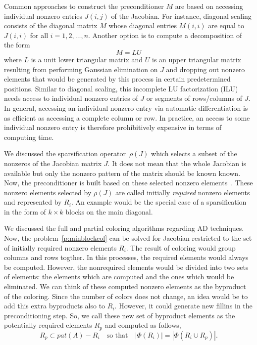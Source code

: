 \documentclass[12pt, oneside]{book}
\newcommand{\sparsifysymbol}{\ensuremath{\rho}}
\newcommand{\sparsify}[1]{\ensuremath{\sparsifysymbol(#1)}}
\begin{document}
Common approaches to construct the preconditioner $M$ are based on accessing individual
nonzero entries $J(i,j)$ of the Jacobian. For instance, diagonal scaling consists of the
diagonal matrix $M$ whose diagonal entries $M(i,i)$ are equal to $J(i,i)$ for all
$i=1,2,\dots, n$. Another option is to compute a decomposition of the form
$$
M = LU
$$
where $L$ is a unit lower triangular matrix and $U$ is an upper triangular matrix
resulting from performing Gaussian elimination on $J$ and dropping out nonzero elements
that would be generated by this process in certain predetermined positions. Similar to
diagonal scaling, this incomplete LU factorization (ILU) needs access to individual
nonzero entries of $J$ or segments of rows/columns of $J$. In general, accessing an
individual nonzero entry via automatic differentiation is as efficient as accessing a
complete column or row. In practice, an access to some individual nonzero entry is
therefore prohibitively expensive in terms of computing time.

We discussed the sparsification operator~\sparsify{J} 
which selects a subset of the nonzeros of the Jacobian matrix $J$. 
It does not mean that the whole Jacobian is available but 
only the nonzero pattern of the matrix should be known known.
Now, the preconditioner is built based on these selected nonzero elements~\cite{Cullum2006}.
These nonzero elements selected by \sparsify{J} are called initially 
\emph{required} nonzero elements and represented by $R_i$. 
An example would be the special case of a sparsification in the form of $k\times k$
blocks on the main diagonal.

We discussed the full and partial coloring algorithms regarding AD techniques. 
Now, the problem~\ref{p:minblockcol} can be solved for Jacobian
restricted to the set of initially
required nonzero elements $R_i$. The result of coloring would group
columns and rows togther. In this processes, the required elements would always
be computed. However, the nonrequired elements would be divided into two sets of
elements: the elements which are computed and the ones which would be 
eliminated. We can think of these computed nonzero elements as the byproduct
of the coloring. Since the number of colors does not change, 
an idea would be to add this extra byproducts also to $R_i$.
However, it could generate new fillins in the preconditioning step.
So, we call these new set of byproduct elements as the potentially
required elements $R_p$ and computed as follows,
$$
R_p \subset pat(A) - R_i \quad\text{so that}\quad |\Phi(R_i)| = |\Phi(R_i\cup R_p)|.
$$ 
\end{document}
